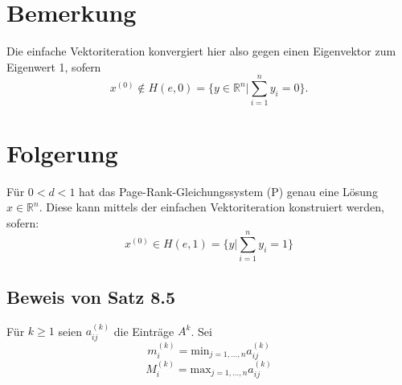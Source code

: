 \documentclass{scrbook}
\begin{document}
\section{Bemerkung}
Die einfache Vektoriteration konvergiert hier also gegen einen Eigenvektor zum Eigenwert 1, sofern \[x^{(0)} \notin H(e,0) = \{y\in \mathbb{R}^n | \sum^n_{i=1} y_i = 0\}.\]
\section{Folgerung}
Für $0<d<1$ hat das Page-Rank-Gleichungssystem (P) genau eine Lösung $x\in \mathbb{R}^n$. Diese kann mittels der einfachen Vektoriteration konstruiert werden, sofern:
\[x^{(0)} \in H(e,1)=\{y|\sum^n_{i=1}y_i = 1\}\]
\subsection*{Beweis von Satz 8.5}
Für $k \geq 1$ seien $a^{(k)}_{ij}$ die Einträge $A^k$. Sei\[m^{(k)}_i=\text{min}_{j=1,...,n} a^{(k)}_{ij}\]\[M^{(k)}_i=\text{max}_{j=1,...,n} a^{(k)}_{ij}\]
\end{document}
